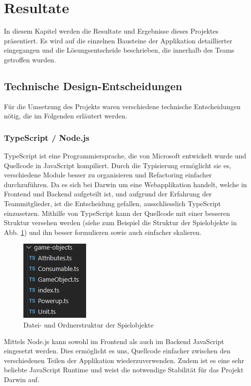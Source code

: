 \documentclass[11pt,a4paper,titlepage]{article}
\begin{document}
\newpage

\section{Resultate}
In diesem Kapitel werden die Resultate und Ergebnisse dieses Projektes präsentiert.
Es wird auf die einzelnen Bausteine der Applikation detaillierter eingegangen und die Lösungsentscheide beschrieben, die innerhalb des Teams getroffen wurden.

\subsection{Technische Design-Entscheidungen}
Für die Umsetzung des Projekts waren verschiedene technische Entscheidungen nötig, die im Folgenden erläutert werden.
\subsubsection{TypeScript / Node.js}
TypeScript ist eine Programmiersprache, die von Microsoft entwickelt wurde und Quellcode in JavaScript kompiliert. Durch die Typisierung ermöglicht sie es, verschiedene Module besser zu organisieren und Refactoring einfacher durchzuführen.
Da es sich bei Darwin um eine Webapplikation handelt, welche in Frontend und Backend aufgeteilt ist, und aufgrund der Erfahrung der Teammitglieder, ist die Entscheidung gefallen, ausschliesslich TypeScript einzusetzen.
Mithilfe von TypeScript kann der Quellcode mit einer besseren Struktur versehen werden (siehe zum Beispiel die Struktur der Spielobjekte in Abb. \ref{types}) und ihn besser formulieren sowie auch einfacher skalieren.

\begin{figure}[H]
	\centering
	\includegraphics{darwintypes.png}
	\caption{Datei- und Ordnerstruktur der Spielobjekte}
	\label{types}
\end{figure}

Mittels Node.js kann sowohl im Frontend als auch im Backend JavaScript eingesetzt werden. Dies ermöglicht es uns, Quellcode einfacher zwischen den verschiedenen Teilen der Applikation wiederzuverwenden. Zudem ist es eine sehr beliebte JavaScript Runtime \cite{node-git} und weist die notwendige Stabilität für das Projekt Darwin auf.
\end{document}
